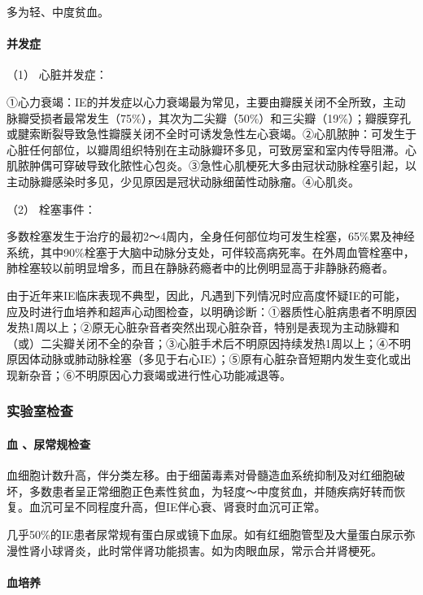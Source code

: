 多为轻、中度贫血。

\paragraph{并发症}

\hypertarget{text00300.htmlux5cux23CHP10-3-2-2-5-1}{}
（1） 心脏并发症：

①心力衰竭：IE的并发症以心力衰竭最为常见，主要由瓣膜关闭不全所致，主动脉瓣受损者最常发生（75\%），其次为二尖瓣（50\%）和三尖瓣（19\%）；瓣膜穿孔或腱索断裂导致急性瓣膜关闭不全时可诱发急性左心衰竭。②心肌脓肿：可发生于心脏任何部位，以瓣周组织特别在主动脉瓣环多见，可致房室和室内传导阻滞。心肌脓肿偶可穿破导致化脓性心包炎。③急性心肌梗死大多由冠状动脉栓塞引起，以主动脉瓣感染时多见，少见原因是冠状动脉细菌性动脉瘤。④心肌炎。

\hypertarget{text00300.htmlux5cux23CHP10-3-2-2-5-2}{}
（2） 栓塞事件：

多数栓塞发生于治疗的最初2～4周内，全身任何部位均可发生栓塞，65\%累及神经系统，其中90\%栓塞于大脑中动脉分支处，可伴较高病死率。在外周血管栓塞中，肺栓塞较以前明显增多，而且在静脉药瘾者中的比例明显高于非静脉药瘾者。

由于近年来IE临床表现不典型，因此，凡遇到下列情况时应高度怀疑IE的可能，应及时进行血培养和超声心动图检查，以明确诊断：①器质性心脏病患者不明原因发热1周以上；②原无心脏杂音者突然出现心脏杂音，特别是表现为主动脉瓣和（或）二尖瓣关闭不全的杂音；③心脏手术后不明原因持续发热1周以上；④不明原因体动脉或肺动脉栓塞（多见于右心IE）；⑤原有心脏杂音短期内发生变化或出现新杂音；⑥不明原因心力衰竭或进行性心功能减退等。

\subsubsection{实验室检查}

\paragraph{血 、尿常规检查}

血细胞计数升高，伴分类左移。由于细菌毒素对骨髓造血系统抑制及对红细胞破坏，多数患者呈正常细胞正色素性贫血，为轻度～中度贫血，并随疾病好转而恢复。血沉可呈不同程度升高，但IE伴心衰、肾衰时血沉可正常。

几乎50\%的IE患者尿常规有蛋白尿或镜下血尿。如有红细胞管型及大量蛋白尿示弥漫性肾小球肾炎，此时常伴肾功能损害。如为肉眼血尿，常示合并肾梗死。

\paragraph{血培养}

